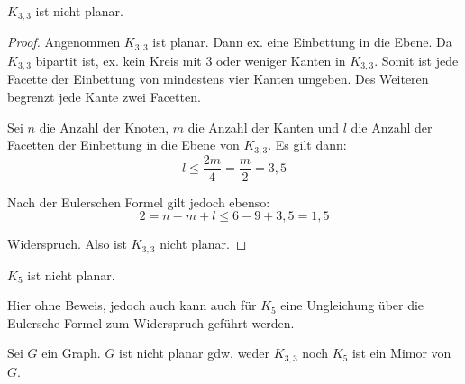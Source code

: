 \begin{lemma}
    \label{lem:k33-planar}
    $ K_{3,3} $ ist nicht planar.
\end{lemma}

\begin{proof}
    Angenommen $ K_{3,3} $ ist planar.
    Dann ex. eine Einbettung in die Ebene.
    Da $ K_{3,3} $ bipartit ist, ex. kein Kreis mit 3 oder weniger Kanten in $ K_{3,3} $.
    Somit ist jede Facette der Einbettung von mindestens vier Kanten umgeben.
    Des Weiteren begrenzt jede Kante zwei Facetten.

    Sei $ n $ die Anzahl der Knoten, $ m $ die Anzahl der Kanten und $ l $ die Anzahl der Facetten der Einbettung in die Ebene von $ K_{3,3} $.
    Es gilt dann:
    \begin{equation*}
        l \leq \frac{2m}{4} = \frac{m}{2} = 3,5
    \end{equation*}

    Nach der Eulerschen Formel gilt jedoch ebenso:
    \begin{equation*}
        2 = n - m + l \leq 6 - 9 + 3,5 = 1,5
    \end{equation*}

    Widerspruch.
    Also ist $ K_{3,3} $ nicht planar.
\end{proof}

\begin{lemma}
    \label{lem:k5-planar}
    $ K_5 $ ist nicht planar.
\end{lemma}

\begin{remark}
    Hier ohne Beweis, jedoch auch kann auch für $ K_5 $ eine Ungleichung über die Eulersche Formel zum Widerspruch geführt werden.
\end{remark}

\begin{theorem}
    Sei $ G $ ein Graph.
    $ G $ ist nicht planar gdw. weder $ K_{3,3} $ noch $ K_5 $ ist ein Mimor von $ G $.
\end{theorem}


